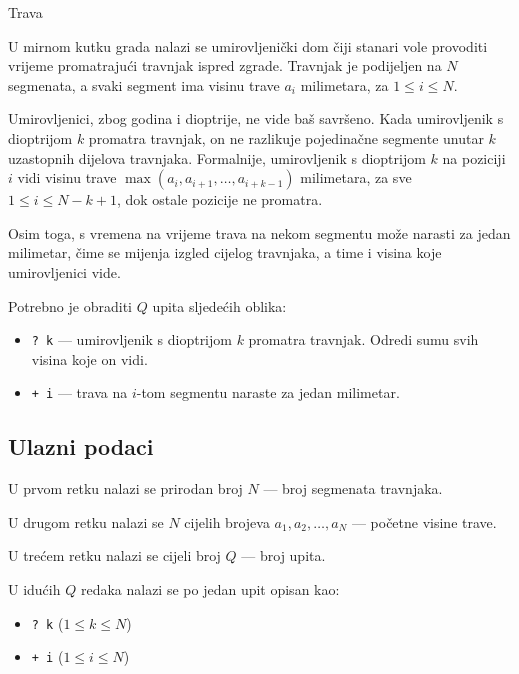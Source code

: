 \begin{statement}[
  problempoints=100,
  timelimit=1 sekunda,
  memorylimit=512 MiB,
]{Trava}\

U mirnom kutku grada nalazi se umirovljenički dom čiji stanari vole provoditi vrijeme promatrajući travnjak ispred zgrade. Travnjak je podijeljen na $N$ segmenata, a svaki segment ima visinu trave $a_i$ milimetara, za $1 \leq i \leq N$.

Umirovljenici, zbog godina i dioptrije, ne vide baš savršeno. Kada umirovljenik s dioptrijom $k$ promatra travnjak, on ne razlikuje pojedinačne segmente unutar $k$ uzastopnih dijelova travnjaka. Formalnije, umirovljenik s dioptrijom $k$ na poziciji $i$ vidi visinu trave $\max(a_i, a_{i+1}, \ldots, a_{i+k-1})$ milimetara, za sve $1 \leq i \leq N - k + 1$, dok ostale pozicije ne promatra.

Osim toga, s vremena na vrijeme trava na nekom segmentu može narasti za jedan milimetar, čime se mijenja izgled cijelog travnjaka, a time i visina koje umirovljenici vide.

Potrebno je obraditi $Q$ upita sljedećih oblika:
\vspace{-0.7em}
\begin{itemize}
    \item \texttt{\frenchspacing? k} — umirovljenik s dioptrijom $k$ promatra travnjak. Odredi sumu svih visina koje on vidi.
    \item \texttt{+ i} — trava na $i$-tom segmentu naraste za jedan milimetar.
\end{itemize}

\subsection*{Ulazni podaci}

U prvom retku nalazi se prirodan broj $N$ — broj segmenata travnjaka.

U drugom retku nalazi se $N$ cijelih brojeva $a_1, a_2, \ldots, a_N$ — početne visine trave.

U trećem retku nalazi se cijeli broj $Q$ — broj upita.

U idućih $Q$ redaka nalazi se po jedan upit opisan kao:
\vspace{-0.7em}
\begin{itemize}
    \item \texttt{\frenchspacing? k} ($1 \leq k \leq N$)
    \item \texttt{+ i} ($1 \leq i \leq N$)
\end{itemize}


\end{statement}
